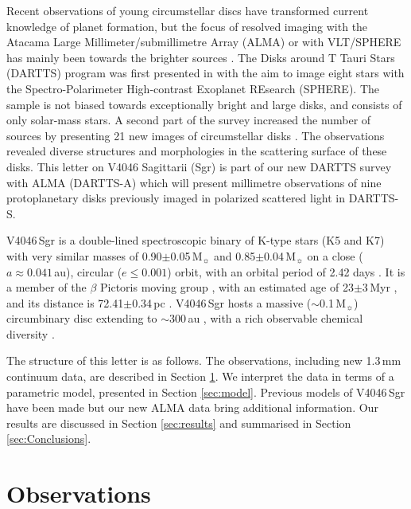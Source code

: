 \documentclass[letters,usenatbib,times]{mnras}
\begin{document}
Recent observations of young circumstellar discs have transformed current knowledge of planet formation, but the focus of resolved imaging with the Atacama Large Millimeter/submillimetre Array (ALMA) or with VLT/SPHERE has mainly been towards the brighter sources \citep{Andrews2020arXiv200105007A}. The Disks around T Tauri Stars (DARTTS) program was first presented in \citet{Avenhaus_2018} with the aim to image eight stars with the Spectro-Polarimeter High-contrast Exoplanet REsearch (SPHERE). The sample is not biased towards exceptionally bright and large disks, and consists of only solar-mass stars. A second part of the survey increased the number of sources by presenting 21 new images of circumstellar disks \citep{Garufi2020}. The observations revealed diverse structures and morphologies in the scattering surface of these disks. This letter on V4046 Sagittarii (Sgr) is part of our new DARTTS survey with ALMA (DARTTS-A) which will present millimetre observations of nine protoplanetary disks previously imaged in polarized scattered light in DARTTS-S. 

V4046\,Sgr is a double-lined spectroscopic binary of K-type stars (K5 and K7) with very similar masses of 0.90$\pm$0.05\,M$_{\sun}$ and 0.85$\pm$0.04\,M$_{\sun}$ \citep{Rosenfeld_2012} on a close ($a \approx 0.041$\,au), circular ($e\leq0.001$) orbit, with an orbital period of 2.42 days \citep{refId0}. It is a member of the $\beta$ Pictoris moving group \citep{Zuckerman_2004}, with an estimated age of 23$\pm$3\,Myr \citep{Mamajek_2014}, and its distance is 72.41$\pm$0.34\,pc \citep{Gaia}. V4046\,Sgr hosts a massive ($\sim$0.1\,M$_{\sun}$) circumbinary disc extending to $\sim$300\,au \citep{Rosenfeld_2013, Rodriguez_2010}, with a rich observable chemical diversity \citep{Kastner_2018}. 

The structure of this letter is as follows. The observations, including new 1.3\,mm continuum data, are described in Section \ref{sec:Observations}. We interpret the data in terms of a parametric model, presented in Section \ref{sec:model}. Previous models of V4046\,Sgr have been made \citep{Ru_z_Rodr_guez_2019, Rosenfeld_2013, 2019ApJ...882..160Q} but our new ALMA data bring additional information. Our results are discussed in Section \ref{sec:results} and summarised in Section \ref{sec:Conclusions}.

\section{Observations} \label{sec:Observations}
\end{document}
